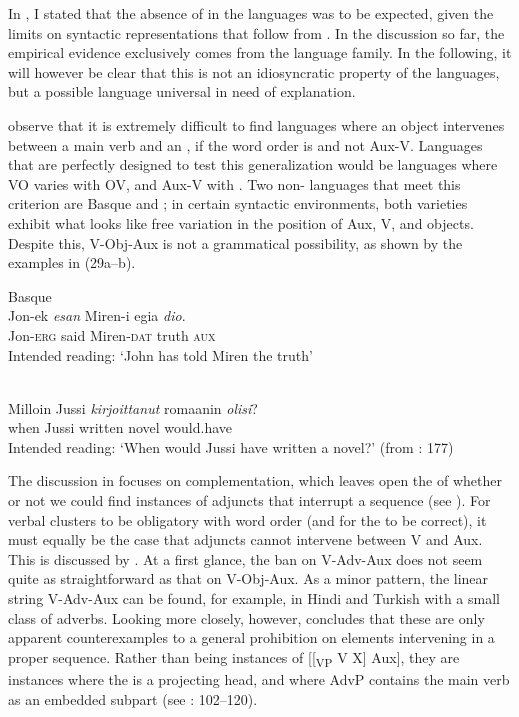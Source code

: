 \documentclass[output=paper, colorlinks, citecolor=brown]{langscibook}
\begin{document}
In , I stated that the absence of  in the  languages was to be expected, given the limits on syntactic representations that follow from . In the discussion so far, the empirical evidence exclusively comes from the  language family. In the following, it will however be clear that this is not an idiosyncratic property of the  languages, but a possible language universal in need of explanation.


\citet{BiberauerEtAl2014} observe that it is extremely difficult to find languages where an object intervenes between a main verb and an , if the word order is  and not Aux-V. Languages that are perfectly designed to test this generalization would be languages where VO varies with OV, and Aux-V with . Two non- languages that meet this criterion are Basque and ; in certain syntactic environments, both varieties exhibit what looks like free variation in the position of Aux, V, and objects. Despite this, V-Obj-Aux is not a grammatical possibility, as shown by the examples in (29a–b).


\ea
\label{ex:sangfelt:29}
\ea Basque\label{ex:sangfelt:29a}\\
\gll * Jon-ek \textit{esan} {Miren-i} {egia} \textit{dio}. \\
 {} Jon-\textsc{erg} said Miren-\textsc{dat} truth \textsc{aux}\\
\glt Intended reading: ‘John has told Miren the truth’

\ex {}\label{ex:sangfelt:29b}\\
\gll * Milloin Jussi \textit{kirjoittanut} {romaanin} \textit{olisi}? \\
 {} when Jussi written novel would.have\\
\glt Intended reading: ‘When would Jussi have written a novel?’ (from \citealt{BiberauerEtAl2014}: 177)\\
\z 
\z 


The discussion in \citet{BiberauerEtAl2014} focuses on complementation, which leaves open the  of whether or not we could find instances of adjuncts that interrupt a  sequence (see ). For verbal clusters to be obligatory with  word order (and for the  to be correct), it must equally be the case that adjuncts cannot intervene between V and Aux. This  is discussed by \citet{Sheehan2017Final}. At a first glance, the ban on V-Adv-Aux does not seem quite as straightforward as that on V-Obj-Aux. As a minor pattern, the linear string V-Adv-Aux can be found, for example, in Hindi and Turkish with a small class of adverbs. Looking more closely, however, \citet{Sheehan2017Final} concludes that these are only apparent counterexamples to a general prohibition on elements intervening in a proper  sequence. Rather than being instances of [[\textsubscript{VP} V X] Aux], they are instances where the  is a projecting head, and where AdvP contains the main verb as an embedded subpart (see \citealt{Sheehan2017Final}: 102–120).
\end{document}
